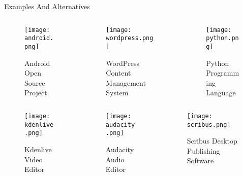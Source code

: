 \documentclass{beamer}
\begin{document}
    \begin{frame}{Examples And Alternatives}
        \begin{columns}
            \begin{column}{0.3\textwidth}
                \begin{figure}
                    \centering
                    \texttt{[image: android.png]}
                    \caption{Android Open Source Project\cite{pngegg}}
                \end{figure}
            \end{column}
            \begin{column}{0.3\textwidth}
                \begin{figure}
                    \centering
                    \texttt{[image: wordpress.png]}
                    \caption{WordPress Content Management System\cite{pngegg}}
                \end{figure}
            \end{column}
            \begin{column}{0.3\textwidth}
                \begin{figure}
                    \centering
                    \texttt{[image: python.png]}
                    \caption{Python Programming Language\cite{pngegg}}
                \end{figure}
            \end{column}
        \end{columns}
        \begin{columns}
            \begin{column}{0.3\textwidth}
                \begin{figure}
                    \centering
                    \texttt{[image: kdenlive.png]}
                    \caption{Kdenlive Video Editor\cite{pngegg}}
                \end{figure}
            \end{column}
            \begin{column}{0.3\textwidth}
                \begin{figure}
                    \centering
                    \texttt{[image: audacity.png]}
                    \caption{Audacity Audio Editor\cite{pngegg}}
                \end{figure}
            \end{column}
            \begin{column}{0.3\textwidth}
                \begin{figure}
                    \centering
                    \texttt{[image: scribus.png]}
                    \caption{Scribus Desktop Publishing Software\cite{pngegg}}
                \end{figure}
            \end{column}
        \end{columns}
    \end{frame}
\end{document}
